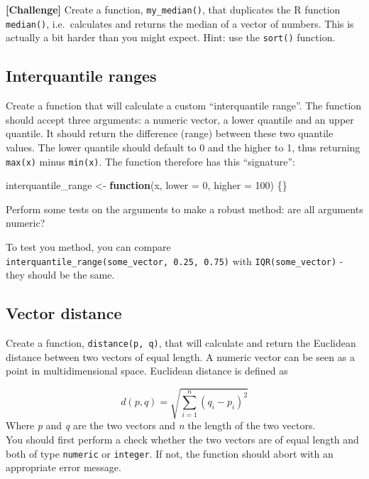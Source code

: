 \documentclass[]{book}
\newenvironment{Shaded}{\begin{snugshade}}{\end{snugshade}}
\newcommand{\ControlFlowTok}[1]{\textcolor[rgb]{0.13,0.29,0.53}{\textbf{#1}}}
\newcommand{\DataTypeTok}[1]{\textcolor[rgb]{0.13,0.29,0.53}{#1}}
\newcommand{\DecValTok}[1]{\textcolor[rgb]{0.00,0.00,0.81}{#1}}
\newcommand{\NormalTok}[1]{#1}
\newcommand{\StringTok}[1]{\textcolor[rgb]{0.31,0.60,0.02}{#1}}
\begin{document}
\textbf{{[}Challenge{]}} Create a function, \texttt{my\_median()}, that duplicates the R function \texttt{median()}, i.e.~calculates and returns the median of a vector of numbers. This is actually a bit harder than you might expect. Hint: use the \texttt{sort()} function.

\hypertarget{interquantile-ranges}{%
\subsection{Interquantile ranges}\label{interquantile-ranges}}

Create a function that will calculate a custom ``interquantile range''. The function should accept three arguments: a numeric vector, a lower quantile and an upper quantile. It should return the difference (range) between these two quantile values. The lower quantile should default to 0 and the higher to 1, thus returning \texttt{max(x)} minus \texttt{min(x)}. The function therefore has this ``signature'':

\begin{Shaded}
\begin{Highlighting}[]
\NormalTok{interquantile_range <-}\StringTok{ }\ControlFlowTok{function}\NormalTok{(x, }\DataTypeTok{lower =} \DecValTok{0}\NormalTok{, }\DataTypeTok{higher =} \DecValTok{100}\NormalTok{) \{\}}
\end{Highlighting}
\end{Shaded}

Perform some tests on the arguments to make a robust method: are all arguments numeric?

To test you method, you can compare \texttt{interquantile\_range(some\_vector,\ 0.25,\ 0.75)} with \texttt{IQR(some\_vector)} - they should be the same.

\hypertarget{vector-distance}{%
\subsection{Vector distance}\label{vector-distance}}

Create a function, \texttt{distance(p,\ q)}, that will calculate and return the Euclidean distance between two vectors of equal length. A numeric vector can be seen as a point in multidimensional space. Euclidean distance is defined as

\[d(p, q) = \sqrt{\sum_{i = 1}^{n}(q_i-p_i)^2}\]
Where \emph{p} and \emph{q} are the two vectors and \emph{n} the length of the two vectors.\\
You should first perform a check whether the two vectors are of equal length and both of type \texttt{numeric} or \texttt{integer}. If not, the function should abort with an appropriate error message.
\end{document}
